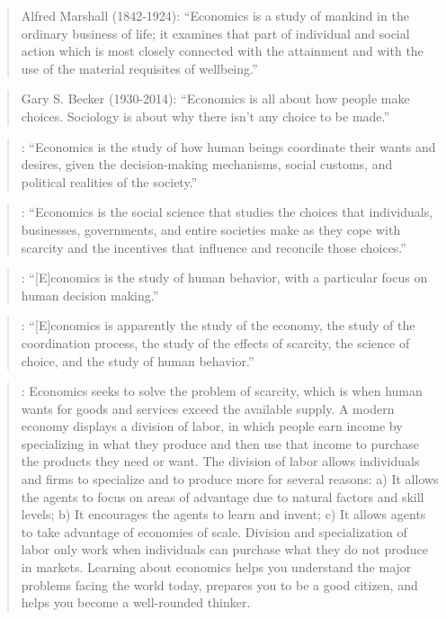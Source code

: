 \documentclass[
  12pt,
  oneside]{book}
\theoremstyle{definition}
\theoremstyle{definition}
\theoremstyle{definition}
\theoremstyle{definition}
\theoremstyle{remark}
\begin{document}
\begin{quote}
Alfred Marshall (1842-1924): ``Economics is a study of mankind in the ordinary business of life; it examines that part of individual and social action which is most closely connected with the attainment and with the use of the material requisites of wellbeing.'' \citet[p.~1]{Marshall2009Principles}
\end{quote}

\begin{quote}
Gary S. Becker (1930-2014): ``Economics is all about how people make choices. Sociology is about why there isn't any choice to be made.'' \citet[p.~233]{Becker1960Economic}
\end{quote}

\begin{quote}
\citet[p.~4]{Colander2006Economics}: ``Economics is the study of how human beings coordinate their wants and desires, given the decision-making mechanisms, social customs, and political realities of the society.''
\end{quote}

\begin{quote}
\citet[p.~2]{Parkin2012Economics}: ``Economics is the social science that studies the choices that individuals, businesses, governments, and entire societies make as they cope with scarcity and the incentives that influence and reconcile those choices.''
\end{quote}

\begin{quote}
\citet[p.~5.]{Gwartney2006Microeconomics}: ``{[}E{]}conomics is the study of human behavior, with a particular focus on human decision making.''
\end{quote}

\begin{quote}
\citet[p.~222]{Backhouse2009Retrospectives}: ``{[}E{]}conomics is apparently the study of the economy, the study of the coordination process, the study of the effects of scarcity, the science of choice, and the study of human behavior.''
\end{quote}

\begin{quote}
\citet[ch.~1]{Greenlaw2018Principles}: Economics seeks to solve the problem of scarcity, which is when human wants for goods and services exceed the available supply. A modern economy displays a division of labor, in which people earn income by specializing in what they produce and then use that income to purchase the products they need or want. The division of labor allows individuals and firms to specialize and to produce more for several reasons: a) It allows the agents to focus on areas of advantage due to natural factors and skill levels; b) It encourages the agents to learn and invent; c) It allows agents to take advantage of economies of scale. Division and specialization of labor only work when individuals can purchase what they do not produce in markets. Learning about economics helps you understand the major problems facing the world today, prepares you to be a good citizen, and helps you become a well-rounded thinker.
\end{quote}
\end{document}
